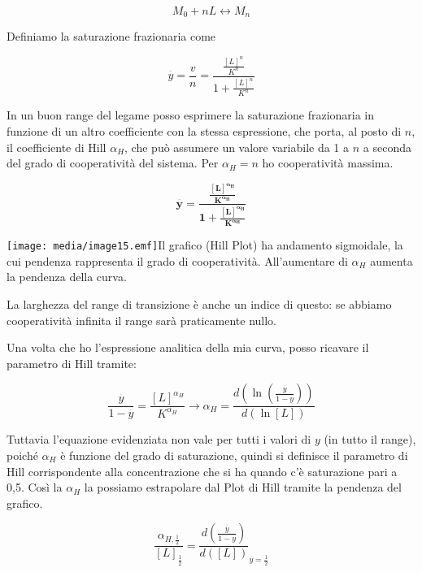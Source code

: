 \[M_{0} + nL \leftrightarrow M_{n}\]

Definiamo la saturazione frazionaria come

\[\overset{\overline{}}{y} = \frac{v}{n} = \frac{\frac{\left\lbrack L \right\rbrack^{n}}{K^{n}}}{1 + \frac{\left\lbrack L \right\rbrack^{n}}{K^{n}}}\]

In un buon range del legame posso esprimere la saturazione frazionaria
in funzione di un altro coefficiente con la stessa espressione, che
porta, al posto di \(n\), il coefficiente di Hill \(\alpha_{H}\), che
può assumere un valore variabile da 1 a \(n\) a seconda del grado di
cooperatività del sistema. Per \(\alpha_{H} = n\) ho cooperatività
massima.

\[\overset{\overline{}}{\mathbf{y}}\mathbf{=}\frac{\frac{\left\lbrack \mathbf{L} \right\rbrack^{\mathbf{\alpha}_{\mathbf{H}}}}{\mathbf{K}^{\mathbf{\alpha}_{\mathbf{H}}}}}{\mathbf{1 +}\frac{\left\lbrack \mathbf{L} \right\rbrack^{\mathbf{\alpha}_{\mathbf{H}}}}{\mathbf{K}^{\mathbf{\alpha}_{\mathbf{H}}}}}\]

\texttt{[image: media/image15.emf]}Il
grafico (Hill Plot) ha andamento sigmoidale, la cui pendenza rappresenta
il grado di cooperatività. All'aumentare di \(\alpha_{H}\) aumenta la
pendenza della curva.

La larghezza del range di transizione è anche un indice di questo: se
abbiamo cooperatività infinita il range sarà praticamente nullo.

Una volta che ho l'espressione analitica della mia curva, posso ricavare
il parametro di Hill tramite:

\[\frac{\overset{\overline{}}{y}}{1 - \overset{\overline{}}{y}} = \frac{\left\lbrack L \right\rbrack^{\alpha_{H}}}{K^{\alpha_{H}}} \rightarrow \alpha_{H} = \frac{d\left( \ln\left( \frac{\overset{\overline{}}{y}}{1 - \overset{\overline{}}{y}} \right) \right)}{d\left( \ln\left\lbrack L \right\rbrack \right)}\]

Tuttavia l'equazione evidenziata non vale per tutti i valori di \(y\)
(in tutto il range), poiché \(\alpha_{H}\) è funzione del grado di
saturazione, quindi si definisce il parametro di Hill corrispondente
alla concentrazione che si ha quando c'è saturazione pari a 0,5. Così la
\(\alpha_{H}\) la possiamo estrapolare dal Plot di Hill tramite la
pendenza del grafico.

\[\frac{\alpha_{H,\frac{1}{2}}}{\left\lbrack L \right\rbrack_{\frac{1}{2}}} = \frac{d\left( \frac{\overset{\overline{}}{y}}{1 - \overset{\overline{}}{y}} \right)}{d\left( \left\lbrack L \right\rbrack \right)}_{\overset{\overline{}}{y} = \frac{1}{2}}\]

